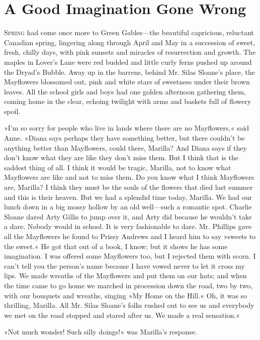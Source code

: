 \chapter{A Good Imagination Gone Wrong}

\lettrine[lines=4]{S}{pring} had come once more to Green Gables—the beautiful capricious, reluctant Canadian spring, lingering along through April and May in a succession of sweet, fresh, chilly days, with pink sunsets and miracles of resurrection and growth. The maples in Lover's Lane were red budded and little curly ferns pushed up around the Dryad's Bubble. Away up in the barrens, behind Mr. Silas Sloane's place, the Mayflowers blossomed out, pink and white stars of sweetness under their brown leaves. All the school girls and boys had one golden afternoon gathering them, coming home in the clear, echoing twilight with arms and baskets full of flowery spoil.

»I'm so sorry for people who live in lands where there are no Mayflowers,« said Anne. »Diana says perhaps they have something better, but there couldn't be anything better than Mayflowers, could there, Marilla? And Diana says if they don't know what they are like they don't miss them. But I think that is the saddest thing of all. I think it would be tragic, Marilla, not to know what Mayflowers are like and not to miss them. Do you know what I think Mayflowers are, Marilla? I think they must be the souls of the flowers that died last summer and this is their heaven. But we had a splendid time today, Marilla. We had our lunch down in a big mossy hollow by an old well—such a romantic spot. Charlie Sloane dared Arty Gillis to jump over it, and Arty did because he wouldn't take a dare. Nobody would in school. It is very fashionable to dare. Mr. Phillips gave all the Mayflowers he found to Prissy Andrews and I heard him to say »sweets to the sweet.« He got that out of a book, I know; but it shows he has some imagination. I was offered some Mayflowers too, but I rejected them with scorn. I can't tell you the person's name because I have vowed never to let it cross my lips. We made wreaths of the Mayflowers and put them on our hats; and when the time came to go home we marched in procession down the road, two by two, with our bouquets and wreaths, singing »My Home on the Hill.« Oh, it was so thrilling, Marilla. All Mr. Silas Sloane's folks rushed out to see us and everybody we met on the road stopped and stared after us. We made a real sensation.«

»Not much wonder! Such silly doings!« was Marilla's response.

